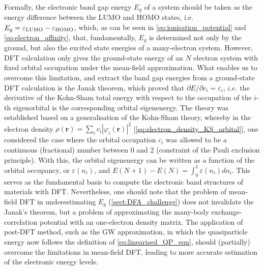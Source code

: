 Formally, the electronic band gap energy $E_g$ of a system should be taken as the energy difference between the LUMO and HOMO states, i.e. $E_g=\varepsilon_{\mbox{\scriptsize{LUMO}}}-\varepsilon_{\mbox{\scriptsize{HOMO}}}$, which, as can be seen in \cref{eq:ionisation_potential} and \cref{eq:electron_affinity}, that, fundamentally, $E_g$ is determined not only by the ground, but also the excited state energies of a many-electron system. However, DFT calculation only gives the ground-state energy of an $N$ electron system with fixed orbital occupation under the mean-field approximation. What enables us to overcome this limitation, and extract the band gap energies from a ground-state DFT calculation is the Janak theorem,\cite{janak1978proof} which proved that $\partial E/\partial c_i=\varepsilon_i$, $i.e.$ the derivative of the Kohn-Sham total energy with respect to the occupation of the $i$-th eigenorbital is the corresponding orbital eigenenergy. The theory was established based on a generalisation of the Kohn-Sham theory, whereby in the electron density $\rho(\bm{r})=\sum_i c_i|\varphi_i(\bm{r})|^2$ [\cref{eq:electron_density_KS_orbital}], one considered the case where the orbital occupation $c_i$ was allowed to be a continuous (fractional) number between 0 and 2 (constraint of the Pauli exclusion principle). With this, the orbital eigenenergy can be written as a function of the orbital occupancy, or $\varepsilon(n_i)$, and $E(N+1)-E(N)=\int_0^1 \varepsilon(n_i)dn_i$. This serves as the fundamental basis to compute the electronic band structures of materials with DFT. Nevertheless, one should note that the problem of mean-field DFT in underestimating $E_{g}$ (\cref{sect:DFA_challenge}) does not invalidate the Janak's theorem, but a problem of approximating the many-body exchange-correlation potential with an one-electron density matrix. The application of post-DFT method, such as the GW approximation, in which the quasiparticle energy now follows the definition of  \cref{eq:linearised_QP_eqn}, should (partially) overcome the limitations in mean-field DFT, leading to more accurate estimation of the electronic energy levels.

